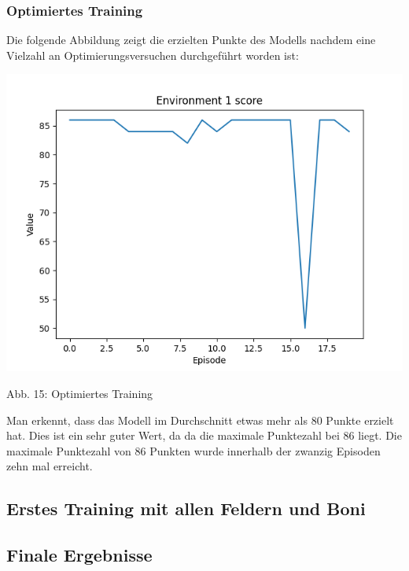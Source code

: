 \subsubsection{Optimiertes Training}
\begin{minipage}{\linewidth}
	Die folgende Abbildung zeigt die erzielten Punkte des Modells nachdem eine Vielzahl an Optimierungsversuchen durchgeführt worden ist:
	
	\vspace{0.5cm}
	\includegraphics[width=1\textwidth]{Bilder/optimizetraining}
	
	Abb. 15: Optimiertes Training\\
\end{minipage}
Man erkennt, dass das Modell im Durchschnitt etwas mehr als 80 Punkte erzielt hat. Dies ist ein sehr guter Wert, da da die maximale Punktezahl bei 86 liegt. Die maximale Punktezahl von 86 Punkten wurde innerhalb der zwanzig Episoden zehn mal erreicht.
\subsection{Erstes Training mit allen Feldern und Boni}
\subsection{Finale Ergebnisse}
